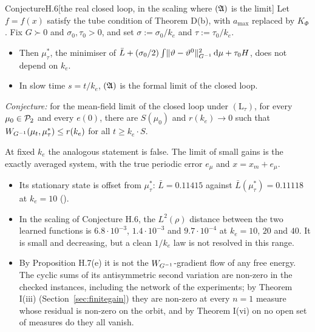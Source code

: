\begin{thm}{Conjecture}{H.6}[the real closed loop, in the scaling where $(\mathfrak{A})$ is the limit]
Let $f = f(x)$ satisfy the tube condition of Theorem D(b), with $a_{\max}$ replaced by $K_\Phi$. Fix $G \succ 0$ and
$\sigma_0, \tau_0 > 0$, and set $\sigma := \sigma_0/k_e$ and $\tau := \tau_0/k_e$.
\begin{itemize}
  \item Then $\mu^*_\tau$, the minimiser of
  $\bar L + (\sigma_0/2)\int\lVert \vartheta - \vartheta^0\rVert^2_{G^{-1}}\,\mathrm{d}\mu + \tau_0 H$, does not depend on $k_e$.
  \item In slow time $s = t/k_e$, $(\mathfrak{A})$ is the formal limit of the closed loop.
\end{itemize}
\emph{Conjecture:} for the mean-field limit of the closed loop under $(\mathrm{L}_\tau)$, for every
$\mu_0 \in \mathcal{P}_2$ and every $e(0)$, there are $S(\mu_0)$ and $r(k_e) \to 0$ such that
$W_{G^{-1}}(\mu_t, \mu^*_\tau) \le r(k_e)$ for all $t \ge k_e\cdot S$.
\end{thm}

At fixed $k_e$ the analogous statement is false. The limit of small gains is the exactly averaged system, with the
true periodic error $e_\mu$ and $x = x_m + e_\mu$.
\begin{itemize}
  \item Its stationary state is offset from $\mu^*_\tau$: $\bar L = 0.11415$ against $\bar L(\mu^*_\tau) = 0.11118$ at
  $k_e = 10$ ().
  \item In the scaling of Conjecture H.6, the $L^2(\rho)$ distance between the two learned functions is
  $6.8\cdot 10^{-3}$, $1.4\cdot 10^{-3}$ and $9.7\cdot 10^{-4}$ at $k_e = 10$, $20$ and $40$. It is small and
  decreasing, but a clean $1/k_e$ law is not resolved in this range.
  \item By Proposition H.7(e) it is not the $W_{G^{-1}}$-gradient flow of any free energy. The cyclic sums of its
  antisymmetric second variation are non-zero in the checked instances, including the network of the experiments; by
  Theorem I(iii) (Section~\ref{sec:finitegain}) they are non-zero at every $n = 1$ measure whose residual is non-zero
  on the orbit, and by Theorem I(vi) on no open set of measures do they all vanish.
\end{itemize}
